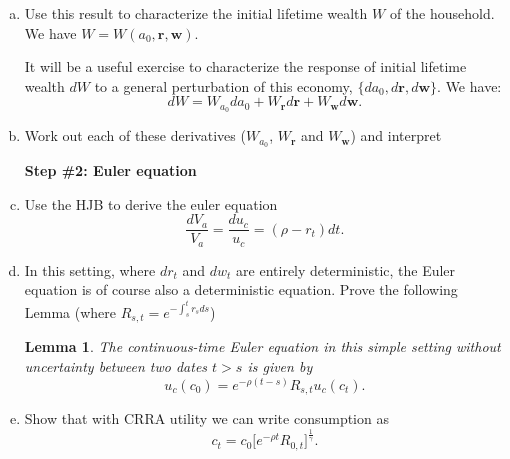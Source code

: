 \documentclass[11pt]{extarticle}
\theoremstyle{plain}
\newtheorem{lem}[thm]{Lemma}
\theoremstyle{definition}
\begin{document}
\begin{enumerate}[(a)]


\item Use this result to characterize the initial lifetime wealth $W$ of the household. We have $W = W(a_0, \bm{r}, \bm{w})$. 


\vspace{5mm}
\noindent
It will be a useful exercise to characterize the response of initial lifetime wealth $dW$ to a general perturbation of this economy, $\{da_0, d \bm r, d \bm w\}$. We have:
\begin{equation*}
	dW = W_{a_0} da_0 + W_{\bm r} d \bm{r} + W_{ \bm w} d \bm w. 
\end{equation*}

\item  Work out each of these derivatives ($ W_{a_0}$, $W_{\bm r}$ and $W_{ \bm w}$) and interpret 

\vspace{5mm}
\noindent
\textbf{Step \#2: Euler equation }



\item Use the HJB to derive the euler equation
\begin{equation*}
	\frac{dV_a}{V_a} = \frac{du_c}{u_c} =  (\rho - r_t) dt. 
\end{equation*}


\item In this setting, where $dr_t$ and $dw_t$ are entirely deterministic, the Euler equation is of course also a deterministic equation. Prove the following Lemma (where $R_{s,t}=e^{-\int_s^t r_s ds}$)
\begin{lem} 
	
	The continuous-time Euler equation in this simple setting without uncertainty between two dates $t > s$ is given by
	\begin{equation*}
		u_c(c_0) = e^{- \rho (t-s)} R_{s,t} u_c(c_t). 
	\end{equation*}
\end{lem}

\item Show that with CRRA utility we can write consumption as 
\begin{equation*}
	c_t = c_0 \bigg[ e^{- \rho t} R_{0,t} \bigg]^\frac{1}{\gamma} .
\end{equation*}


\end{enumerate}
\end{document}
